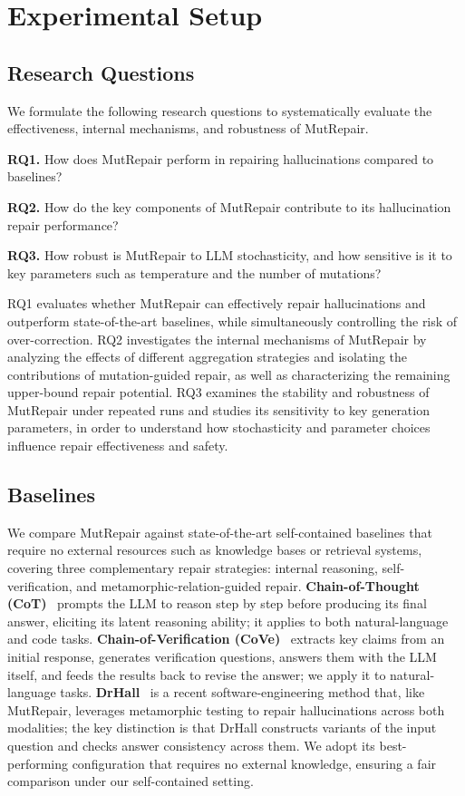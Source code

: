 \documentclass[acmsmall,screen,review,anonymous]{acmart}
\begin{document}
\section{Experimental Setup}
\subsection{Research Questions}
We formulate the following research questions to systematically evaluate the effectiveness, internal mechanisms, and robustness of MutRepair. 

\textbf{RQ1.} How does MutRepair perform in repairing hallucinations compared to baselines?

\textbf{RQ2.} How do the key components of MutRepair contribute to its hallucination repair performance? 

\textbf{RQ3.} How robust is MutRepair to LLM stochasticity, and how sensitive is it to key parameters such as temperature and the number of mutations?

RQ1 evaluates whether MutRepair can effectively repair hallucinations and outperform state-of-the-art baselines, while simultaneously controlling the risk of over-correction.  
RQ2 investigates the internal mechanisms of MutRepair by analyzing the effects of different aggregation strategies and isolating the contributions of mutation-guided repair, as well as characterizing the remaining upper-bound repair potential.  
RQ3 examines the stability and robustness of MutRepair under repeated runs and studies its sensitivity to key generation parameters, in order to understand how stochasticity and parameter choices influence repair effectiveness and safety.


\subsection{Baselines}

We compare MutRepair against state-of-the-art self-contained baselines that require no external resources such as knowledge bases or retrieval systems, covering three complementary repair strategies: internal reasoning, self-verification, and metamorphic-relation-guided repair. \textbf{Chain-of-Thought (CoT)}~\cite{wei2022chain} prompts the LLM to reason step by step before producing its final answer, eliciting its latent reasoning ability; it applies to both natural-language and code tasks. \textbf{Chain-of-Verification (CoVe)}~\cite{dhuliawala2024chain} extracts key claims from an initial response, generates verification questions, answers them with the LLM itself, and feeds the results back to revise the answer; we apply it to natural-language tasks. \textbf{DrHall}~\cite{wu2025detecting} is a recent software-engineering method that, like MutRepair, leverages metamorphic testing to repair hallucinations across both modalities; the key distinction is that DrHall constructs variants of the input question and checks answer consistency across them. We adopt its best-performing configuration that requires no external knowledge, ensuring a fair comparison under our self-contained setting.
\end{document}
